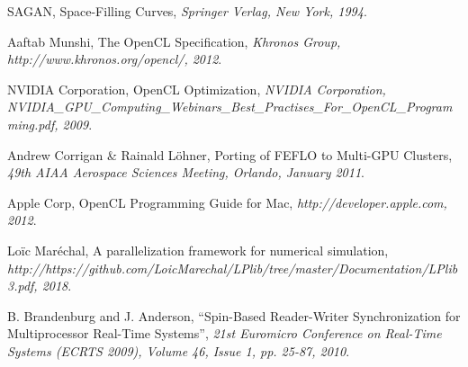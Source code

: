 \documentclass[a4paper,12pt]{article}
\begin{document}
%
%


\begin{thebibliography}{99}
\small

	SAGAN,
	Space-Filling Curves,
	\emph{Springer Verlag, New York, 1994}.

	Aaftab Munshi,
	The OpenCL Specification,
	\emph{Khronos Group, http://www.khronos.org/opencl/, 2012}.

	NVIDIA Corporation,
	OpenCL Optimization,
	\emph{NVIDIA Corporation, NVIDIA\_GPU\_Computing\_Webinars\_Best\_Practises\_For\_OpenCL\_Programming.pdf, 2009}.

	Andrew Corrigan \& Rainald Löhner,
	Porting of FEFLO to Multi-GPU Clusters,
	\emph{49th AIAA Aerospace Sciences Meeting, Orlando, January 2011}.

	Apple Corp,
	OpenCL Programming Guide for Mac,
	\emph{http://developer.apple.com, 2012}.

	Loïc Maréchal,
	A parallelization framework for numerical simulation,
	\emph{http://https://github.com/LoicMarechal/LPlib/tree/master/Documentation/LPlib3.pdf, 2018}.

   B. Brandenburg and J. Anderson,
   “Spin-Based Reader-Writer Synchronization for Multiprocessor Real-Time Systems”,
   \emph{21st Euromicro Conference on Real-Time Systems (ECRTS 2009), Volume 46, Issue 1, pp. 25-87, 2010}.

\end{thebibliography}
\end{document}
